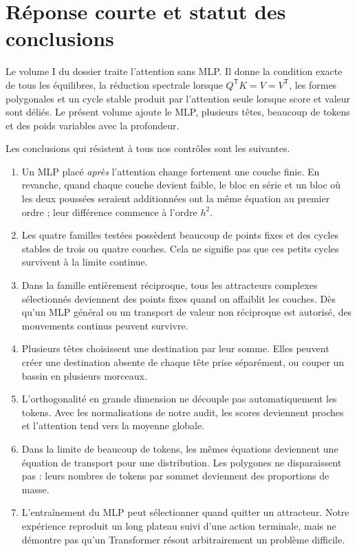 \documentclass[11pt,a4paper]{article}
\theoremstyle{definition}
\newcommand{\T}{\mathsf T}
\begin{document}
\clearpage
\tableofcontents
\newpage

\section{Réponse courte et statut des conclusions}

Le volume I du dossier traite l'attention sans MLP. Il donne la condition exacte de
tous les équilibres, la réduction spectrale lorsque $Q^{\T}K=V=V^{\T}$, les formes
polygonales et un cycle stable produit par l'attention seule lorsque score et valeur
sont déliés. Le présent volume ajoute le MLP, plusieurs têtes, beaucoup de tokens et
des poids variables avec la profondeur.

Les conclusions qui résistent à tous nos contrôles sont les suivantes.

\begin{enumerate}
  \item Un MLP placé \emph{après} l'attention change fortement une couche finie. En
  revanche, quand chaque couche devient faible, le bloc en série et un bloc où les
  deux poussées seraient additionnées ont la même équation au premier ordre ; leur
  différence commence à l'ordre $h^2$.
  \item Les quatre familles testées possèdent beaucoup de points fixes et des cycles
  stables de trois ou quatre couches. Cela ne signifie pas que ces petits cycles
  survivent à la limite continue.
  \item Dans la famille entièrement réciproque, tous les attracteurs complexes
  sélectionnés deviennent des points fixes quand on affaiblit les couches. Dès qu'un
  MLP général ou un transport de valeur non réciproque est autorisé, des mouvements
  continus peuvent survivre.
  \item Plusieurs têtes choisissent une destination par leur somme. Elles peuvent
  créer une destination absente de chaque tête prise séparément, ou couper un bassin
  en plusieurs morceaux.
  \item L'orthogonalité en grande dimension ne découple pas automatiquement les
  tokens. Avec les normalisations de notre audit, les scores deviennent proches et
  l'attention tend vers la moyenne globale.
  \item Dans la limite de beaucoup de tokens, les mêmes équations deviennent une
  équation de transport pour une distribution. Les polygones ne disparaissent pas :
  leurs nombres de tokens par sommet deviennent des proportions de masse.
  \item L'entraînement du MLP peut sélectionner quand quitter un attracteur. Notre
  expérience reproduit un long plateau suivi d'une action terminale, mais ne démontre
  pas qu'un Transformer résout arbitrairement un problème difficile.
\end{enumerate}
\end{document}
